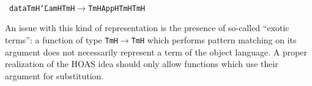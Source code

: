 \documentclass[9pt,preprint,authoryear]{sigplanconf}
\begin{document}
%
%
%
~\\~\vphantom{$\{$}\textcolor[cmyk]{0,0.65,0.99,0}{\texttt{data}}\textcolor[rgb]{0,0,0.80}{\texttt{\mbox{\hspace{0.50em}}}}\textcolor[rgb]{0,0,0.80}{\texttt{TmH}}\textcolor[rgb]{0,0,0.80}{\texttt{\mbox{\hspace{0.50em}}}}\textcolor[cmyk]{0,0.65,0.99,0}{\texttt{{\char `\=}}}\textcolor[rgb]{0,0,0.80}{\texttt{\mbox{\hspace{0.50em}}}}\textcolor[rgb]{0.70,0.13,0.13}{\texttt{LamH}}\textcolor[rgb]{0,0,0.80}{\texttt{\mbox{\hspace{0.50em}}}}\textcolor[cmyk]{0,0.65,0.99,0}{\texttt{\makebox[1.22ex][l]{$ {(} $}}}\textcolor[rgb]{0,0,0.80}{\texttt{TmH}}\textcolor[rgb]{0,0,0.80}{\texttt{\mbox{\hspace{0.50em}}}}\textcolor[cmyk]{0,0.65,0.99,0}{\texttt{$ \rightarrow $}}\textcolor[rgb]{0,0,0.80}{\texttt{\mbox{\hspace{0.50em}}}}\textcolor[rgb]{0,0,0.80}{\texttt{TmH}}\textcolor[cmyk]{0,0.65,0.99,0}{\texttt{\makebox[1.22ex][r]{$ {)} $}}}\textcolor[rgb]{0,0,0.80}{\texttt{\mbox{\hspace{0.50em}}}}\textcolor[cmyk]{0,0.65,0.99,0}{\texttt{\makebox[1.22ex][c]{\textbar{}}}}\textcolor[rgb]{0,0,0.80}{\texttt{\mbox{\hspace{0.50em}}}}\textcolor[rgb]{0.70,0.13,0.13}{\texttt{AppH}}\textcolor[rgb]{0,0,0.80}{\texttt{\mbox{\hspace{0.50em}}}}\textcolor[rgb]{0,0,0.80}{\texttt{TmH}}\textcolor[rgb]{0,0,0.80}{\texttt{\mbox{\hspace{0.50em}}}}\textcolor[rgb]{0,0,0.80}{\texttt{TmH}}\textcolor[rgb]{0,0,0.80}{\texttt{{\nopagebreak \newline%
}\vphantom{$\{$}}}%


%
An issue with this kind of representation is the presence of
    so-called {``}exotic terms{''}{:} a function of type \textcolor[rgb]{0,0,0.80}{\texttt{TmH}}\textcolor[rgb]{0,0,0.80}{\texttt{\mbox{\hspace{0.50em}}}}\textcolor[cmyk]{0,0.65,0.99,0}{\texttt{$ \rightarrow $}}\textcolor[rgb]{0,0,0.80}{\texttt{\mbox{\hspace{0.50em}}}}\textcolor[rgb]{0,0,0.80}{\texttt{TmH}} which
    performs pattern matching on its argument does not necessarily
    represent a term of the object language. A proper realization of the
    HOAS idea should only allow functions which use their argument for
    substitution.%
\end{document}
